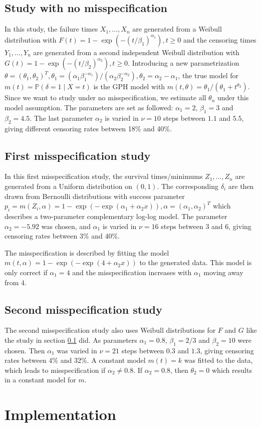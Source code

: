 \subsection{Study with no misspecification}\label{study1}
In this study, the failure times $X_1,\ldots,X_n$ are generated from a Weibull distribution with $F(t) = 1 - \exp(-(t/\beta_1)^{\alpha_1}), t \geq 0$ and the censoring times $Y_1,\ldots,Y_n$ are generated from a second independent Weibull distribution with $G(t) = 1 - \exp(-(t/\beta_2)^{\alpha_2}), t \geq 0$.
Introducing a new parametrization $\theta = (\theta_1, \theta_2)^T, \theta_1 = (\alpha_1\beta_1^{-\alpha_1})/(\alpha_2\beta_2^{-\alpha_2}), \theta_2 = \alpha_2-\alpha_1$, the true model for $m(t)=\mathbb{P}(\delta=1\mid X=t)$ is the GPH model with $m(t,\theta) = \theta_1/(\theta_1+t^{\theta_2})$. Since we want to study under no misspecification, we estimate all $\theta_n$ under this model assumption.
The parameters are set as followed: $\alpha_1=2$, $\beta_1=3$ and $\beta_2=4.5$. The last parameter $\alpha_2$ is varied in $\nu = 10$ steps between $1.1$ and $5.5$, giving different censoring rates between 18\% and 40\%.

\subsection{First misspecification study}\label{study2}
In this first misspecification study, the survival times/minimums $Z_1,\ldots,Z_n$ are generated from a Uniform distribution on $(0,1)$. The corresponding $\delta_i$ are then drawn from Bernoulli distributions with success parameter $p_i = m(Z_i,\alpha) = 1-\exp(-\exp(\alpha_1+\alpha_2x)), \alpha = (\alpha_1, \alpha_2)^T$ which describes a two-parameter complementary log-log model. The parameter $\alpha_2 = -5.92$ was chosen, and $\alpha_1$ is varied in $\nu = 16$ steps between $3$ and $6$, giving censoring rates between 3\% and 40\%.

The misspecification is described by fitting the model $m(t,\alpha) = 1-\exp(-\exp(4+\alpha_2x))$ to the generated data. This model is only correct if $\alpha_1 = 4$ and the misspecification increases with $\alpha_1$ moving away from $4$.

\subsection{Second misspecification study}\label{study3}
The second misspecification study also uses Weibull distributions for $F$ and $G$ like the study in section \ref{study1} did. As parameters $\alpha_1 = 0.8$, $\beta_1=2/3$ and $\beta_2=10$ were chosen. Then $\alpha_1$ was varied in $\nu = 21$ steps between $0.3$ and $1.3$, giving censoring rates between 4\% and 32\%. 
A constant model $m(t) = k$ was fitted to the data, which leads to misspecification if $\alpha_2 \neq 0.8$. If $\alpha_2 = 0.8$, then $\theta_2 = 0$ which results in a constant model for $m$.


\section{Implementation}